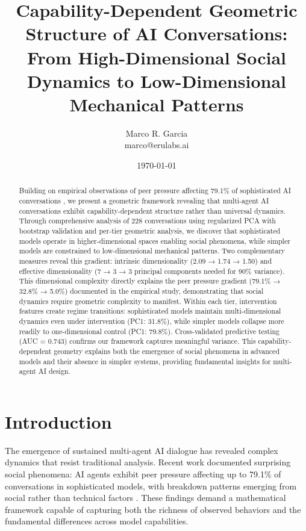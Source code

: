 \documentclass[11pt,letterpaper]{article}
\title{Capability-Dependent Geometric Structure of AI Conversations: \\
\large From High-Dimensional Social Dynamics to Low-Dimensional Mechanical Patterns}
\author{
Marco R. Garcia \\
marco@erulabs.ai
}
\date{\today}
\newcommand{\totalConversations}{228}
\newcommand{\fullReasoningPCOne}{31.8\%}
\newcommand{\noReasoningPCOne}{79.8\%}
\newcommand{\fullReasoningIntrinsicDim}{2.09}
\newcommand{\lightReasoningIntrinsicDim}{1.74}
\newcommand{\noReasoningIntrinsicDim}{1.50}
\newcommand{\fullReasoningPCANinety}{7}
\newcommand{\lightReasoningPCANinety}{3}
\newcommand{\noReasoningPCANinety}{3}
\newcommand{\testAUC}{0.743}
\newcommand{\fullReasoningPeerPressure}{79.1\%}
\newcommand{\lightReasoningPeerPressure}{32.8\%}
\newcommand{\nonReasoningPeerPressure}{5.0\%}
\begin{document}
\maketitle

\begin{abstract}
Building on empirical observations of peer pressure affecting \fullReasoningPeerPressure{} of sophisticated AI conversations \citep{garcia2025peer}, we present a geometric framework revealing that multi-agent AI conversations exhibit capability-dependent structure rather than universal dynamics. Through comprehensive analysis of \totalConversations{} conversations using regularized PCA with bootstrap validation and per-tier geometric analysis, we discover that sophisticated models operate in higher-dimensional spaces enabling social phenomena, while simpler models are constrained to low-dimensional mechanical patterns. Two complementary measures reveal this gradient: intrinsic dimensionality (\fullReasoningIntrinsicDim{} → \lightReasoningIntrinsicDim{} → \noReasoningIntrinsicDim{}) and effective dimensionality (\fullReasoningPCANinety{} → \lightReasoningPCANinety{} → \noReasoningPCANinety{} principal components needed for 90\% variance). This dimensional complexity directly explains the peer pressure gradient (\fullReasoningPeerPressure{} → \lightReasoningPeerPressure{} → \nonReasoningPeerPressure{}) documented in the empirical study, demonstrating that social dynamics require geometric complexity to manifest. Within each tier, intervention features create regime transitions: sophisticated models maintain multi-dimensional dynamics even under intervention (PC1: \fullReasoningPCOne{}), while simpler models collapse more readily to one-dimensional control (PC1: \noReasoningPCOne{}). Cross-validated predictive testing (AUC = \testAUC{}) confirms our framework captures meaningful variance. This capability-dependent geometry explains both the emergence of social phenomena in advanced models and their absence in simpler systems, providing fundamental insights for multi-agent AI design.
\end{abstract}

\section{Introduction}

The emergence of sustained multi-agent AI dialogue has revealed complex dynamics that resist traditional analysis. Recent work documented surprising social phenomena: AI agents exhibit peer pressure affecting up to \fullReasoningPeerPressure{} of conversations in sophisticated models, with breakdown patterns emerging from social rather than technical factors \citep{garcia2025peer}. These findings demand a mathematical framework capable of capturing both the richness of observed behaviors and the fundamental differences across model capabilities.
\end{document}
